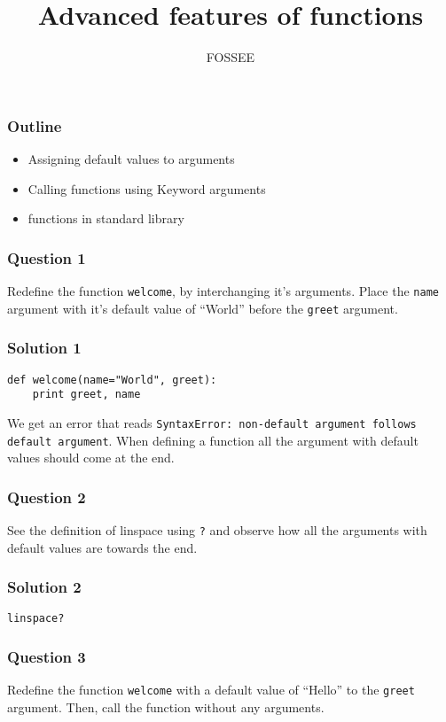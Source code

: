 \documentclass[presentation]{beamer}
\title{Advanced features of functions}
\author{FOSSEE}
\date{}
\begin{document}
\maketitle









\begin{frame}
\frametitle{Outline}
\label{sec-1}

\begin{itemize}
\item Assigning default values to arguments
\item Calling functions using Keyword arguments
\item functions in standard library
\end{itemize}
\end{frame}
\begin{frame}
\frametitle{Question 1}
\label{sec-2}

  Redefine the function \texttt{welcome}, by interchanging it's
  arguments. Place the \texttt{name} argument with it's default value of
  ``World'' before the \texttt{greet} argument.
\end{frame}
\begin{frame}[fragile]
\frametitle{Solution 1}
\label{sec-3}

\lstset{language=Python}
\begin{lstlisting}
def welcome(name="World", greet):
    print greet, name
\end{lstlisting}
  We get an error that reads \texttt{SyntaxError: non-default argument   follows default argument}. When defining a function all the
  argument with default values should come at the end.
\end{frame}
\begin{frame}
\frametitle{Question 2}
\label{sec-4}

  See the definition of linspace using \texttt{?} and observe how all the
  arguments with default values are towards the end.
\end{frame}
\begin{frame}[fragile]
\frametitle{Solution 2}
\label{sec-5}

\lstset{language=Python}
\begin{lstlisting}
linspace?
\end{lstlisting}
\end{frame}
\begin{frame}
\frametitle{Question 3}
\label{sec-6}

  Redefine the function \texttt{welcome} with a default value of
  ``Hello'' to the \texttt{greet} argument. Then, call the function without any
  arguments. 
\end{frame}
\end{document}
